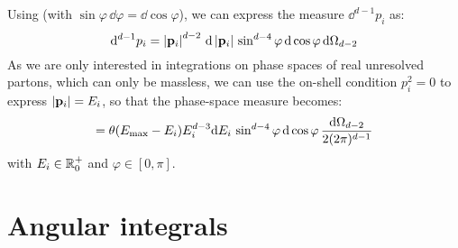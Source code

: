 Using  (with $ \sin \varphi \, \dd \varphi = \dd \cos \varphi $), we can express the measure $ \dd^{d-1} p_i $ as:
\begin{equation}
  \mathrm{d}^{d-1} p_i = \left\lvert\mathbf{p}_i\right\rvert^{d-2} \, \mathrm{d} \left\lvert\mathbf{p}_i\right\rvert \, \sin^{d-4} \varphi \, \mathrm{d} \cos \varphi \, \mathrm{d} \Omega_{d-2}
\end{equation}
As we are only interested in integrations on phase spaces of real unresolved partons, which can only be massless, we can use the on-shell condition $ p_i^2 = 0 $ to express $ \left\lvert\mathbf{p}_i\right\rvert = E_i $, so that the phase-space measure becomes:
\begin{equation}
  [\dd p_i] = \theta(\ema - E_i) E_i^{d-3} \dd E_i \, \sin^{d-4} \varphi \, \dd \cos \varphi \, \frac{\dd \Omega_{d-2}}{2(2\pi)^{d-1}}
\end{equation}
with $ E_i \in \mathbb{R}^+_0 $ and $ \varphi \in [0,\pi] $.

\section{Angular integrals}










